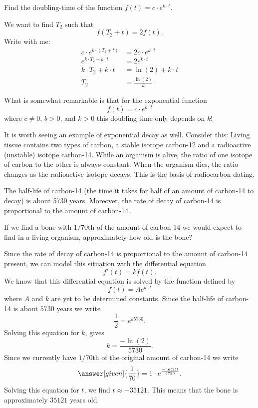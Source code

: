 \documentclass{ximera}
\begin{document}
\begin{example}
  Find the doubling-time of the function $f(t) = c\cdot e^{k\cdot t}$.
  \begin{explanation}
    We want to find $T_2$ such that
    \[
    f(T_2+t) = 2 f(t).
    \]
    Write with me:
    \begin{align*}
    c\cdot e^{k\cdot (T_2+t)} &= 2 c\cdot e^{k\cdot t}\\
    e^{k\cdot T_2+k\cdot t} &= 2 e^{k\cdot t}\\
    k\cdot T_2+k\cdot t &= \ln (2) + k\cdot t\\
    T_2 &= \frac{\ln (2)}{k}
    \end{align*}
  \end{explanation}
\end{example}

What is somewhat remarkable is that for the exponential function
  \[
  f(t) = c\cdot e^{k\cdot t}
  \]
  where $c\ne 0$, $b>0$, and $k>0$ this doubling time only depends on
  $k$!




It is worth seeing an example of exponential decay as well. Consider
this: Living tissue contains two types of carbon, a stable isotope
carbon-12 and a radioactive (unstable) isotope carbon-14. While an
organism is alive, the ratio of one isotope of carbon to the other is
always constant. When the organism dies, the ratio changes as the
radioactive isotope decays.  This is the basis of radiocarbon dating.


\begin{example}
The half-life of carbon-14 (the time it takes for half of an amount of
carbon-14 to decay) is about 5730 years. Moreover, the rate of decay
of carbon-14 is proportional to the amount of carbon-14.

If we find a bone with $1/70$th of the amount of carbon-14 we would
expect to find in a living organism, approximately how old is the
bone?

\begin{explanation}
Since the rate of decay of carbon-14 is proportional to the amount of
carbon-14 present, we can model this situation with the differential
equation
\[
f'(t) = k f(t).
\]
We know that this differential equation is solved by the function
defined by
\[
f(t) = A e^{k\cdot t}
\]
where $A$ and $k$ are yet to be determined constants. Since the
half-life of carbon-14 is about $5730$ years we write
\[
\frac{1}{2} = e^{k 5730}.
\]
Solving this equation for $k$, gives
\[
k = \frac{-\ln(2)}{5730}.
\]
Since we currently have $1/70$th of the original amount of carbon-14
we write
\[
\answer[given]{\frac{1}{70}} = 1\cdot e^{\frac{-\ln(2)t}{5730}}.
\]
Solving this equation for $t$, we find $t \approx -35121$. This means
that the bone is approximately $35121$ years old.
\end{explanation}
\end{example}
\end{document}
